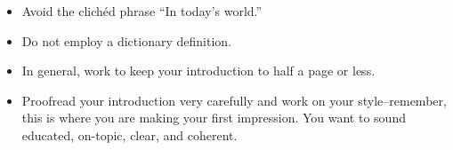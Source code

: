 \begin{itemize}
\item Avoid the clich\'ed phrase ``In today's world.''
        	
\item Do not employ a dictionary definition.
       	
\item In general, work to keep your introduction to half a page or less.    	  
 
\item Proofread your introduction very carefully and work on your style--remember, this is where you are making your first impression. You want to sound educated, on-topic, clear, and coherent.
 \end{itemize}
 
